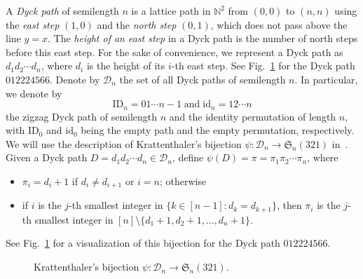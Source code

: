 \documentclass[12pt]{amsart} %
\numberwithin{equation}{section}
\theoremstyle{plain}
\theoremstyle{definition}
\newcommand{\N}{\mathbb{N}}
\def\id{\mathrm{id}}
\def\ID{\mathrm{ID}}
\def\S{\mathfrak{S}}
\begin{document}
A {\em Dyck path} of semilength $n$ is a lattice path in $\N^2$ from $(0,0)$ to
$(n,n)$ using the {\em east step} $(1,0)$ and the {\em north step} $(0,1)$, which does
not pass above the line $y=x$. The {\em height of an east step} in a Dyck path is the number of north steps before this east step. For the sake of convenience, we represent a Dyck path  as $d_1d_2\cdots d_n$, where $d_i$ is the height of its $i$-th east step. See Fig.~\ref{ex:varphi} for the Dyck path $012224566$. Denote by $\mathcal{D}_n$ the set of all Dyck paths of semilength $n$. In particular, we denote by $$\ID_n=01\cdots n-1\;\text{and}\; \id_n=12\cdots n$$ the zigzag Dyck path of semilength $n$ and the identity permutation of length $n$, with $\ID_0$ and $\id_0$ being the empty path and the empty permutation, respectively. We will use the description of Krattenthaler's bijection  $\psi:\mathcal{D}_n\rightarrow\S_n(321)$ in~\cite{kl}. Given a Dyck path $D=d_1d_2\cdots d_n\in\mathcal{D}_n$,  define $\psi(D)=\pi=\pi_1\pi_2\cdots\pi_n$, where 
\begin{itemize}
\item $\pi_i=d_i+1$ if $d_i\neq d_{i+1}$ or $i=n$; otherwise
\item  if $i$ is the $j$-th smallest integer in $\{k\in[n-1]: d_k=d_{k+1}\}$, then $\pi_i$ is the $j$-th smallest integer in $[n]\setminus\{d_1+1,d_2+1,\ldots,d_n+1\}$.
\end{itemize}
See Fig.~\ref{ex:varphi} for  a  visualization of this bijection for the Dyck path $012224566$.
\begin{figure}%
\begin{center}
\end{center}
\caption{Krattenthaler's bijection $\psi:\mathcal{D}_n\rightarrow\S_n(321)$.}
\label{ex:varphi}
\end{figure}
\end{document}
